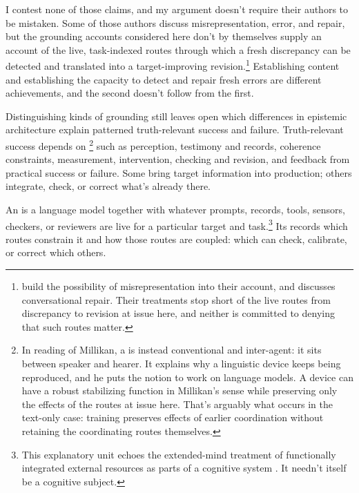 \documentclass[12pt]{article}
\begin{document}
I contest none of those claims, and my argument doesn't require their authors to be
mistaken. Some of those authors discuss misrepresentation, error, and repair, but the
grounding accounts considered here don't by themselves supply an account of the live,
task-indexed routes through which a fresh discrepancy can be detected and translated into
a target-improving revision.\footnote{%
\textcite{coelho_mollo_milliere_2026_vector_grounding_problem} build
the possibility of misrepresentation into their account, and
\textcite{attah_2025_do_language_models_lack_communicative_intentions}
discusses conversational repair. Their treatments stop short of the live routes from
discrepancy to revision at issue here, and neither is committed to denying that such routes
matter.} Establishing content and establishing the capacity to detect and repair fresh
errors are different achievements, and the second doesn't follow from the first.

Distinguishing kinds of grounding still leaves open which differences in epistemic
architecture explain patterned truth-relevant success and failure. Truth-relevant success
depends on \footnote{In
 reading of
Millikan, a  is instead conventional and inter-agent: it sits
between speaker and hearer. It explains why a linguistic device keeps being reproduced,
and he puts the notion to work on language models. A device can have a robust stabilizing
function in Millikan's sense while preserving only the effects of the routes at issue
here. That's arguably what occurs in the text-only case: training preserves effects of
earlier coordination without retaining the coordinating routes themselves.} such as perception, testimony and records,
coherence constraints, measurement, intervention, checking and revision, and feedback
from practical success or failure. Some bring target
information into production; others integrate, check, or correct what's already there.

An  is a language model together with whatever prompts, records, tools,
sensors, checkers, or reviewers are live for a particular target and task.\footnote{This
explanatory unit echoes the extended-mind treatment of functionally integrated external
resources as parts of a cognitive system \citep{clark_chalmers_1998_extended_mind}. It needn't
itself be a cognitive subject.} Its
 records which routes constrain it and how those routes are coupled: which
can check, calibrate, or correct which others.
\end{document}
